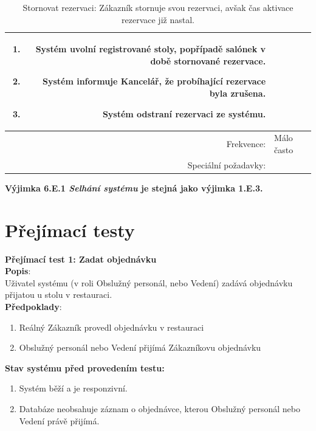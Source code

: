 \documentclass[a4paper,10pt]{article}
\begin{document}
\begin{table}[ht!]
{\begin{tabular}{| r | p{12cm} |}
\begin{minipage}[t]{0.75\textwidth}
\begin{enumerate}[nosep,after=\strut]
            \item Systém uvolní registrované stoly, popřípadě salónek v době stornované rezervace.
            \item Systém informuje Kancelář, že probíhající rezervace byla zrušena.
            \item Systém odstraní rezervaci ze systému. 
    	\end{enumerate}
    \end{minipage} \\
    \hline
    Frekvence: & Málo často \\
    \hline
    Speciální požadavky: & \\  
        \hline

\end{tabular}}
\caption{Stornovat rezervaci: Zákazník stornuje svou rezervaci, avšak čas aktivace rezervace již nastal.}
\label{table:2}
\end{table}

\textbf{Výjimka 6.E.1 \textit{Selhání systému} je stejná jako výjimka 1.E.3.}
\newpage

\newpage
\section*{Přejímací testy}

{\large\textbf{Přejímací test 1: Zadat objednávku}} \\

\textbf{Popis}: \\\indent Uživatel systému (v roli Obslužný personál, nebo Vedení) zadává objednávku přijatou u stolu v restauraci. \\

\textbf{Předpoklady}: 
\begin{enumerate}
	\item Reálný Zákazník provedl objednávku v restauraci
	\item Obslužný personál nebo Vedení přijímá Zákazníkovu objednávku
\end{enumerate}

\textbf{Stav systému před provedením testu:}
\begin{enumerate}
	\item Systém běží a je responzivní.
	\item Databáze neobsahuje záznam o objednávce, kterou Obslužný personál nebo Vedení právě přijímá. 
\end{enumerate}
\end{document}
